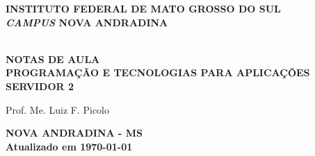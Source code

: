\thispagestyle{empty}

\vfill
 \begin{center}
    
    {\large\bfseries INSTITUTO FEDERAL DE MATO GROSSO DO SUL} \\
    
    {\large\bfseries \textit{CAMPUS} NOVA ANDRADINA}  \\ 

    \vspace*{1in}

    \vspace*{4cm}
    \noindent \\
    
    \large\bfseries{NOTAS DE AULA} \\
    \huge\bfseries{PROGRAMAÇÃO E TECNOLOGIAS PARA APLICAÇÕES SERVIDOR 2}
    
    \vspace*{4cm}
    
    \large{Prof. Me. Luiz F. Picolo}
    
    \vfill
    \large\bfseries{NOVA ANDRADINA - MS} \\ 
    \vspace{0.2cm}
    \small Atualizado em \today
\end{center}

\normalsize


